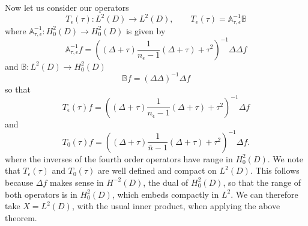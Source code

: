\documentclass[12pt]{article}
\begin{document}
Now let us consider our operators 
\begin{equation}\label{Te2}
 T_\epsilon (\tau): L^2(D) \to L^2(D),\qquad  T_\epsilon (\tau) =  \mathbb{A}_{\tau,\epsilon}^{-1} \mathbb{B}
 \end{equation}
 where  $\mathbb{A}_{\tau,\epsilon}^{-1}: H_0^2(D)\to H^2_0(D)$ is given by 
$$ \mathbb{A}_{\tau,\epsilon}^{-1} f  = \left( (\Delta +\tau ) \frac{1}{n_\epsilon-1} (\Delta +\tau ) +\tau^2 \right)^{-1}\Delta\Delta f $$
and $\mathbb{B}:L^2(D)\to H^2_0(D)$
$$ \mathbb{B}f = (\Delta\Delta)^{-1}\Delta f$$
so that 
\begin{equation}\label{Te3}
 T_\epsilon (\tau) f = \left( (\Delta +\tau ) \frac{1}{n_\epsilon-1} (\Delta +\tau ) +\tau^2 \right)^{-1}\Delta f 
 \end{equation}
 and
 \begin{equation}\label{T03}
 T_0 (\tau) f = \left( (\Delta +\tau ) \frac{1}{\overline{n}-1} (\Delta +\tau ) +\tau^2 \right)^{-1}\Delta f .
 \end{equation}
where the inverses of the fourth order operators have range in $H^2_0(D)$.  We note that $T_\epsilon(\tau)$ and $T_0(\tau)$ are well defined and compact on $L^2(D)$. This follows because $\Delta f $ makes sense in $H^{-2}(D)$, the dual of $H^2_0(D)$, so that the range of both operators is in $H^2_0(D)$, which embeds compactly in $L^2$.  We can therefore take $X=L^2(D)$, with the usual inner product, when applying the above theorem.  
\end{document}
